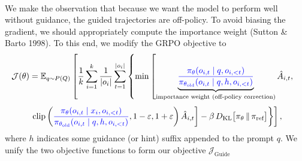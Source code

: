 \documentclass{article}
\begin{document}
\paragraph{} We make the observation that because we want the model to perform well without guidance, the guided trajectories are off-policy. To avoid biasing the gradient, we should appropriately compute the importance weight (Sutton \& Barto 1998). To this end, we modify the GRPO objective to
\begin{equation}
\mathcal{J}(\theta) = 
\mathbb{E}_{q \sim P(Q)} 
\left[
\frac{1}{k} \sum_{i=1}^{k} \frac{1}{|o_i|} \sum_{t=1}^{|o_i|}
\left\{
\min\left[
\underbrace{
\textcolor{blue}{
\frac{\pi_\theta(o_{i,t} \mid q, o_{i,<t})}
     {\pi_{\theta_{\text{old}}}(o_{i,t} \mid q, h, o_{i,<t})}
}}_{\text{importance weight (off-policy correction)}}
\hat{A}_{i,t},\;
\right.\right.
\right.
\end{equation}
\[
\left.\left.\left.
\text{clip}\left(
\textcolor{blue}{
\frac{\pi_\theta(o_{i,t} \mid x_i, o_{i,<t})}
     {\pi_{\theta_{\text{old}}}(o_{i,t} \mid q, h, o_{i,<t})}
}, 1-\varepsilon, 1+\varepsilon\right)
\hat{A}_{i,t}
\right]
- \beta\, D_{\text{KL}}\bigl[\pi_\theta \,\|\, \pi_{\text{ref}}\bigr]
\right\}
\right],
\]
where $h$ indicates some guidance (or hint) suffix appended to the prompt $q$. We unify the two objective functions to form our objective $\mathcal{J}_{\text{Guide}}$

\pagebreak
\end{document}
